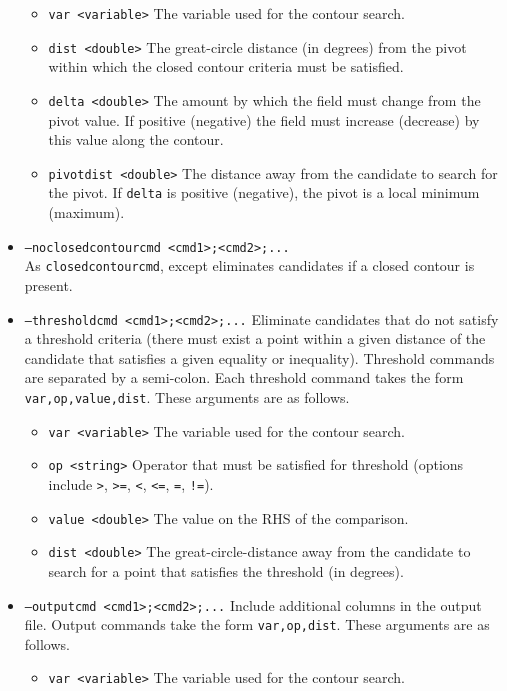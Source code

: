 \documentclass[gmdd, hvmath, online]{copernicus_discussions}
\begin{document}
\begin{itemize}
\begin{itemize}
\item[] \texttt{var <variable>}  The variable used for the contour search.
\item[] \texttt{dist <double>}  The great-circle distance (in degrees) from the pivot within which the closed contour criteria must be satisfied.
\item[] \texttt{delta <double>}  The amount by which the field must change from the pivot value.  If positive (negative) the field must increase (decrease) by this value along the contour.
\item[] \texttt{pivotdist <double>}  The distance away from the candidate to search for the pivot.  If \texttt{delta} is positive (negative), the pivot is a local minimum (maximum).
\end{itemize}
\item[] \texttt{--noclosedcontourcmd <cmd1>;<cmd2>;...} \\ As \texttt{closedcontourcmd}, except eliminates candidates if a closed contour is present.
\item[] \texttt{--thresholdcmd <cmd1>;<cmd2>;...}  Eliminate candidates that do not satisfy a threshold criteria (there must exist a point within a given distance of the candidate that satisfies a given equality or inequality).  Threshold commands are separated by a semi-colon.  Each threshold command takes the form \texttt{var,op,value,dist}.  These arguments are as follows.
\begin{itemize}
\item[] \texttt{var <variable>}  The variable used for the contour search.
\item[] \texttt{op <string>}  Operator that must be satisfied for threshold (options include \texttt{>}, \texttt{>=}, \texttt{<}, \texttt{<=}, \texttt{=}, \texttt{!=}).
\item[] \texttt{value <double>}  The value on the RHS of the comparison.
\item[] \texttt{dist <double>}  The great-circle-distance away from the candidate to search for a point that satisfies the threshold (in degrees).
\end{itemize}
\item[] \texttt{--outputcmd <cmd1>;<cmd2>;...}  Include additional columns in the output file.  Output commands take the form \texttt{var,op,dist}. These arguments are as follows.
\begin{itemize}
\item[] \texttt{var <variable>}  The variable used for the contour search.

\end{itemize}
\end{itemize}
\end{document}
